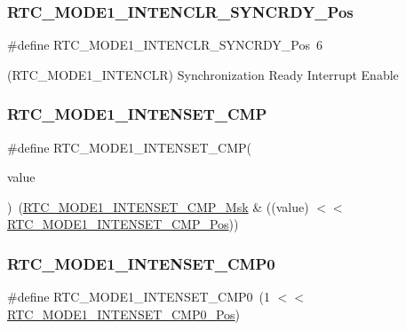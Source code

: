 \subsubsection{\texorpdfstring{RTC\_MODE1\_INTENCLR\_SYNCRDY\_Pos}{RTC\_MODE1\_INTENCLR\_SYNCRDY\_Pos}}
{\footnotesize\ttfamily \#define R\+T\+C\+\_\+\+M\+O\+D\+E1\+\_\+\+I\+N\+T\+E\+N\+C\+L\+R\+\_\+\+S\+Y\+N\+C\+R\+D\+Y\+\_\+\+Pos~6}



(R\+T\+C\+\_\+\+M\+O\+D\+E1\+\_\+\+I\+N\+T\+E\+N\+C\+LR) Synchronization Ready Interrupt Enable 

\mbox{\label{group___s_a_m_d21___r_t_c_gabbe90a64baf2b73cd0b69cd5d1ebcea9}} 
\subsubsection{\texorpdfstring{RTC\_MODE1\_INTENSET\_CMP}{RTC\_MODE1\_INTENSET\_CMP}}
{\footnotesize\ttfamily \#define R\+T\+C\+\_\+\+M\+O\+D\+E1\+\_\+\+I\+N\+T\+E\+N\+S\+E\+T\+\_\+\+C\+MP(\begin{DoxyParamCaption}\item[{}]{value }\end{DoxyParamCaption})~(\mbox{\hyperlink{group___s_a_m_d21___r_t_c_gaa6ce26117bcf02cb52e06cc251e7c570}{R\+T\+C\+\_\+\+M\+O\+D\+E1\+\_\+\+I\+N\+T\+E\+N\+S\+E\+T\+\_\+\+C\+M\+P\+\_\+\+Msk}} \& ((value) $<$$<$ \mbox{\hyperlink{group___s_a_m_d21___r_t_c_gadb593c31ce067b73c78ba0b4fbddcf3f}{R\+T\+C\+\_\+\+M\+O\+D\+E1\+\_\+\+I\+N\+T\+E\+N\+S\+E\+T\+\_\+\+C\+M\+P\+\_\+\+Pos}}))}

\mbox{\label{group___s_a_m_d21___r_t_c_ga155e51a9228b8d7ffcf5f01dcafb463d}} 
\subsubsection{\texorpdfstring{RTC\_MODE1\_INTENSET\_CMP0}{RTC\_MODE1\_INTENSET\_CMP0}}
{\footnotesize\ttfamily \#define R\+T\+C\+\_\+\+M\+O\+D\+E1\+\_\+\+I\+N\+T\+E\+N\+S\+E\+T\+\_\+\+C\+M\+P0~(1 $<$$<$ \mbox{\hyperlink{group___s_a_m_d21___r_t_c_ga7830610a722eb45838faf424c4f16808}{R\+T\+C\+\_\+\+M\+O\+D\+E1\+\_\+\+I\+N\+T\+E\+N\+S\+E\+T\+\_\+\+C\+M\+P0\+\_\+\+Pos}})}

